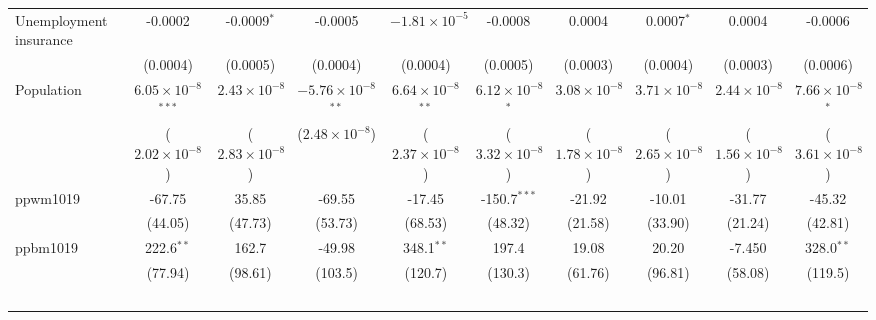 \documentclass{article}
\begin{document}
\begin{landscape}
\begin{longtable}{@{\extracolsep{5pt}}lccccccccc}
  \hspace{3mm}Unemployment insurance& -0.0002                       & -0.0009$^{*}$           & -0.0005                       & $-1.81\times 10^{-5}$        & -0.0008                     & 0.0004                       & 0.0007$^{*}$            & 0.0004                        & -0.0006\\   
                        & (0.0004)                      & (0.0005)                & (0.0004)                      & (0.0004)                     & (0.0005)                    & (0.0003)                     & (0.0004)                & (0.0003)                      & (0.0006)\\     
   Population             & $6.05\times 10^{-8}$$^{***}$  & $2.43\times 10^{-8}$    & $-5.76\times 10^{-8}$$^{**}$  & $6.64\times 10^{-8}$$^{**}$  & $6.12\times 10^{-8}$$^{*}$  & $3.08\times 10^{-8}$         & $3.71\times 10^{-8}$    & $2.44\times 10^{-8}$          & $7.66\times 10^{-8}$$^{*}$\\    
                        & ($2.02\times 10^{-8}$)        & ($2.83\times 10^{-8}$)  & ($2.48\times 10^{-8}$)        & ($2.37\times 10^{-8}$)       & ($3.32\times 10^{-8}$)      & ($1.78\times 10^{-8}$)       & ($2.65\times 10^{-8}$)  & ($1.56\times 10^{-8}$)        & ($3.61\times 10^{-8}$)\\    
   ppwm1019             & -67.75                        & 35.85                   & -69.55                        & -17.45                       & -150.7$^{***}$              & -21.92                       & -10.01                  & -31.77                        & -45.32\\   
                        & (44.05)                       & (47.73)                 & (53.73)                       & (68.53)                      & (48.32)                     & (21.58)                      & (33.90)                 & (21.24)                       & (42.81)\\   
   ppbm1019             & 222.6$^{**}$                  & 162.7                   & -49.98                        & 348.1$^{**}$                 & 197.4                       & 19.08                        & 20.20                   & -7.450                        & 328.0$^{**}$\\   
                        & (77.94)                       & (98.61)                 & (103.5)                       & (120.7)                      & (130.3)                     & (61.76)                      & (96.81)                 & (58.08)                       & (119.5)\\   
$$
\end{longtable}
\end{landscape}
\end{document}
